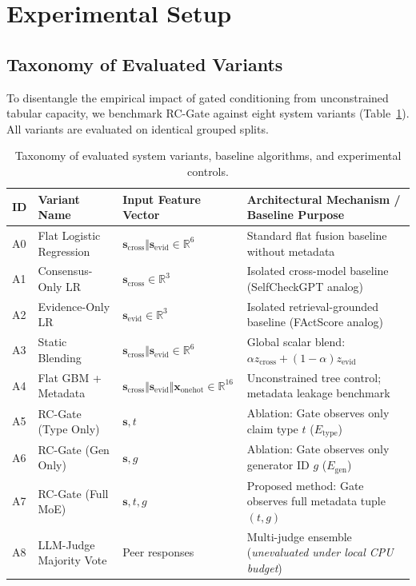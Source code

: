 \documentclass[pdflatex,sn-mathphys,Numbered]{sn-jnl}
\begin{document}
\section{Experimental Setup}\label{sec:setup}

\subsection{Taxonomy of Evaluated Variants}\label{subsec:variants}

To disentangle the empirical impact of gated conditioning from unconstrained tabular capacity, we benchmark RC-Gate against eight system variants (Table~\ref{tab:variants_full}). All variants are evaluated on identical grouped splits.

\begin{table}[htbp]
\caption{Taxonomy of evaluated system variants, baseline algorithms, and experimental controls.}\label{tab:variants_full}
\footnotesize
\setlength{\tabcolsep}{3.5pt}
\begin{tabular}{@{}llll@{}}
\toprule
\textbf{ID} & \textbf{Variant Name} & \textbf{Input Feature Vector} & \textbf{Architectural Mechanism / Baseline Purpose} \\
\midrule
A0 & Flat Logistic Regression & $\mathbf{s}_{\mathrm{cross}} \Vert \mathbf{s}_{\mathrm{evid}} \in \mathbb{R}^6$ & Standard flat fusion baseline without metadata \\
A1 & Consensus-Only LR & $\mathbf{s}_{\mathrm{cross}} \in \mathbb{R}^3$ & Isolated cross-model baseline (SelfCheckGPT analog) \\
A2 & Evidence-Only LR & $\mathbf{s}_{\mathrm{evid}} \in \mathbb{R}^3$ & Isolated retrieval-grounded baseline (FActScore analog) \\
A3 & Static Blending & $\mathbf{s}_{\mathrm{cross}} \Vert \mathbf{s}_{\mathrm{evid}} \in \mathbb{R}^6$ & Global scalar blend: $\alpha z_{\mathrm{cross}} + (1-\alpha) z_{\mathrm{evid}}$ \\
A4 & Flat GBM + Metadata & $\mathbf{s}_{\mathrm{cross}} \Vert \mathbf{s}_{\mathrm{evid}} \Vert \mathbf{x}_{\mathrm{onehot}} \in \mathbb{R}^{16}$ & Unconstrained tree control; metadata leakage benchmark \\
A5 & RC-Gate (Type Only) & $\mathbf{s}, t$ & Ablation: Gate observes only claim type $t$ ($E_{\mathrm{type}}$) \\
A6 & RC-Gate (Gen Only) & $\mathbf{s}, g$ & Ablation: Gate observes only generator ID $g$ ($E_{\mathrm{gen}}$) \\
A7 & RC-Gate (Full MoE) & $\mathbf{s}, t, g$ & Proposed method: Gate observes full metadata tuple $(t, g)$ \\
A8 & LLM-Judge Majority Vote & Peer responses & Multi-judge ensemble (\emph{unevaluated under local CPU budget}) \\
\bottomrule
\end{tabular}
\end{table}
\end{document}
